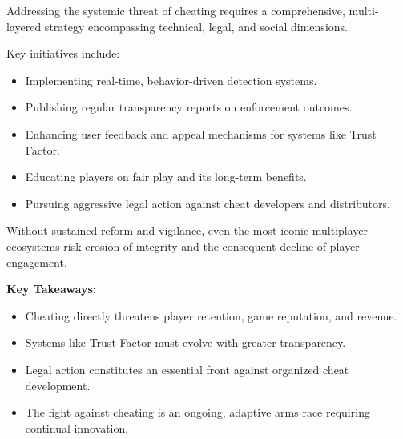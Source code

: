 Addressing the systemic threat of cheating requires a comprehensive, multi-layered strategy encompassing technical, legal, and social dimensions.

Key initiatives include:

\begin{itemize}
    \item Implementing real-time, behavior-driven detection systems.
    \item Publishing regular transparency reports on enforcement outcomes.
    \item Enhancing user feedback and appeal mechanisms for systems like Trust Factor.
    \item Educating players on fair play and its long-term benefits.
    \item Pursuing aggressive legal action against cheat developers and distributors.
\end{itemize}

Without sustained reform and vigilance, even the most iconic multiplayer ecosystems risk erosion of integrity and the consequent decline of player engagement.

\vspace{1em}

\begin{tcolorbox}[colback=gray!10, colframe=gray!50, boxrule=0pt, sharp corners, width=\linewidth, left=1mm, right=1mm, top=0.5mm, bottom=0.5mm]
\textbf{Key Takeaways:}
\begin{itemize}
    \item Cheating directly threatens player retention, game reputation, and revenue.
    \item Systems like Trust Factor must evolve with greater transparency.
    \item Legal action constitutes an essential front against organized cheat development.
    \item The fight against cheating is an ongoing, adaptive arms race requiring continual innovation.
\end{itemize}
\end{tcolorbox}
